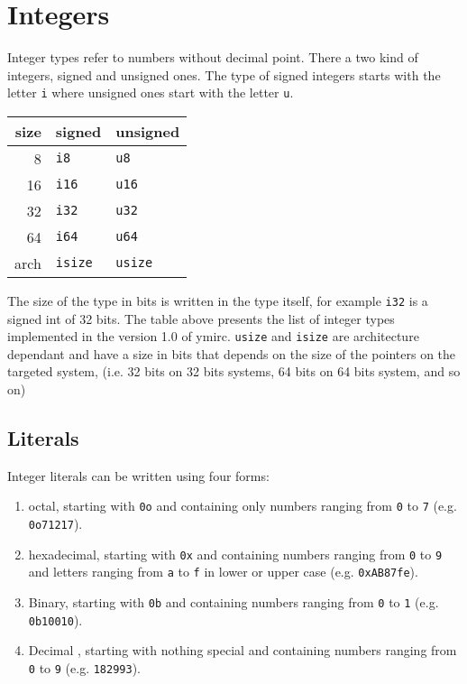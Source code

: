 \section{Integers}
\label{sec:orga8b7d2e}

Integer types refer to numbers without decimal point. There a two kind of
integers, signed and unsigned ones. The type of signed integers starts with the
letter \texttt{i} where unsigned ones start with the letter \texttt{u}.

\begin{center}
  \begin{tabular}{|r|ll|}
    \hline
    size & signed & unsigned\\[0pt]
    \hline
    \hline
    8 & \texttt{i8} & \texttt{u8}\\[0pt]
    16 & \texttt{i16} & \texttt{u16}\\[0pt]
    32 & \texttt{i32} & \texttt{u32}\\[0pt]
    64 & \texttt{i64} & \texttt{u64}\\[0pt]
    arch & \texttt{isize} & \texttt{usize}\\[0pt]
    \hline
  \end{tabular}
\end{center}

The size of the type in bits is written in the type itself, for example
\texttt{i32} is a signed int of 32 bits. The table above presents the list
of integer types implemented in the version 1.0 of ymirc. \texttt{usize} and
\texttt{isize} are architecture dependant and have a size in bits that depends
on the size of the pointers on the targeted system, (i.e. 32 bits on 32 bits
systems, 64 bits on 64 bits system, and so on)


\vspace{-10pt}%
\subsection{Literals}
\label{sec:org2cf045d}

Integer literals can be written using four forms:
\begin{enumerate}
\item octal, starting with \texttt{0o} and containing only numbers ranging from \texttt{0} to \texttt{7}
  (e.g. \texttt{0o71217}).
  \vspace{-2pt}%
\item hexadecimal, starting with \texttt{0x} and containing numbers ranging from \texttt{0} to \texttt{9} and letters ranging from \texttt{a} to \texttt{f} in lower or upper case
  (e.g. \texttt{0xAB87fe}).
  \vspace{-2pt}%
\item Binary, starting with \texttt{0b} and containing numbers ranging from \texttt{0} to \texttt{1} (e.g. \texttt{0b10010}).
  \vspace{-2pt}%
\item Decimal , starting with nothing special and containing numbers ranging from \texttt{0} to \texttt{9}
  (e.g. \texttt{182993}).
\end{enumerate}

